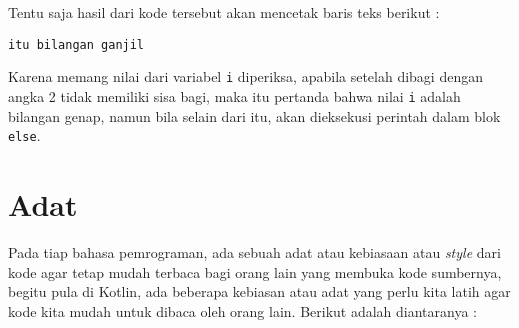 Tentu saja hasil dari kode tersebut akan mencetak baris teks berikut :

\begin{lstlisting}
itu bilangan ganjil
\end{lstlisting}

Karena memang nilai dari variabel \texttt{i} diperiksa, apabila setelah dibagi dengan angka 2 tidak memiliki sisa bagi, maka itu pertanda bahwa nilai \texttt{i} adalah bilangan genap, namun bila selain dari itu, akan dieksekusi perintah dalam blok \texttt{else}.

\section{Adat}

Pada tiap bahasa pemrograman, ada sebuah adat atau kebiasaan atau \textit{style} dari kode agar tetap mudah terbaca bagi orang lain yang membuka kode sumbernya, begitu pula di Kotlin, ada beberapa kebiasan atau adat yang perlu kita latih agar kode kita mudah untuk dibaca oleh orang lain. Berikut adalah diantaranya :

